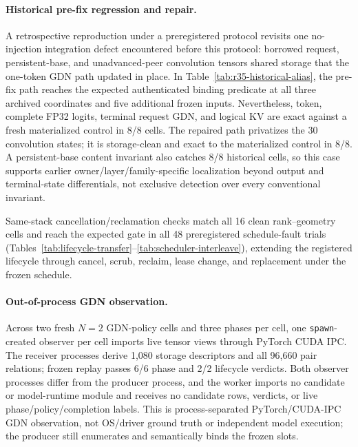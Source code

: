 \documentclass{article}
\begin{document}
\paragraph{Historical pre-fix regression and repair.}
A retrospective reproduction under a preregistered protocol revisits one
no-injection integration defect encountered before this protocol: borrowed
request, persistent-base, and unadvanced-peer convolution tensors shared
storage that the one-token GDN path updated in place.  In
Table~\ref{tab:r35-historical-alias}, the pre-fix
path reaches the expected authenticated binding predicate at all three
archived coordinates and five additional frozen inputs.  Nevertheless, token,
complete FP32 logits, terminal request GDN, and logical KV are exact against a
fresh materialized control in 8/8 cells.  The repaired path privatizes the 30
convolution states; it is storage-clean and exact to the materialized control
in 8/8.  A persistent-base content invariant also catches 8/8 historical
cells, so this case supports earlier owner/layer/family-specific localization
beyond output and terminal-state differentials, not exclusive detection over
every conventional invariant.



Same-stack cancellation/reclamation checks match all 16 clean rank--geometry
cells and reach the expected gate in all 48 preregistered schedule-fault trials
(Tables~\ref{tab:lifecycle-transfer}--\ref{tab:scheduler-interleave}), extending
the registered lifecycle through cancel, scrub, reclaim, lease change, and
replacement under the frozen schedule.

\paragraph{Out-of-process GDN observation.}
Across two fresh $N=2$ GDN-policy cells and three phases per cell, one
\texttt{spawn}-created observer per cell imports live tensor views through
PyTorch CUDA IPC.  The receiver processes derive 1,080 storage descriptors and
all 96,660 pair relations; frozen replay passes 6/6 phase and 2/2 lifecycle
verdicts.  Both observer processes differ from the producer process, and the
worker imports no candidate or model-runtime module and receives no candidate
rows, verdicts, or live phase/policy/completion labels.  This is
process-separated PyTorch/CUDA-IPC GDN observation, not OS/driver ground truth
or independent model execution; the producer still enumerates and semantically
binds the frozen slots.
\end{document}
